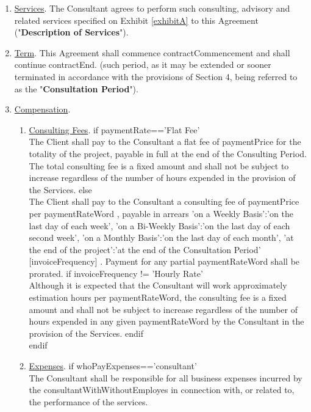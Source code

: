 \documentclass[12pt]{article}
\newcommand{\VAR}[1]{{\color{blue}#1}}
\newcommand{\BLOCK}[1]{{\smallskip \color{red}#1 \\ }}
\begin{document}
\begin{enumerate}
    \item \underline{Services}. The Consultant agrees to perform such consulting, advisory and related services specified on Exhibit \ref{exhibitA}
 to this Agreement ("{\bf Description of Services}").
    \item \underline{Term}. This Agreement shall commence \VAR{contractCommencement} and shall continue \VAR{contractEnd}. (such period, as it may be extended or sooner terminated in accordance with the provisions of Section 4, being referred to as the "{\bf Consultation Period}").
    \item \underline{Compensation}.
    \begin{enumerate}
        \item \underline{Consulting Fees}.
        \BLOCK{ if paymentRate=='Flat Fee' }
            The Client shall pay to the Consultant a flat fee of \VAR{ paymentPrice }
            for the totality of the project, payable in full at the end of the Consulting Period. The total consulting fee is a fixed amount and shall not be subject to increase regardless of the number of hours expended in the provision of the Services.
        \BLOCK{ else }
            The Client shall pay to the Consultant a consulting fee of \VAR{ paymentPrice } per \VAR{ paymentRateWord }, payable in arrears
            \VAR{
                {
                    'on a Weekly Basis':'on the last day of each week',
                    'on a Bi-Weekly Basis':'on the last day of each second week',
                    'on a Monthly Basis':'on the last day of each month',
                    'at the end of the project':'at the end of the Consultation Period'
                }[invoiceFrequency]
            }. Payment for any partial \VAR{ paymentRateWord }  shall be prorated.
            \BLOCK{ if invoiceFrequency != 'Hourly Rate' }
                Although it is expected that the Consultant will work approximately \VAR{estimation} hours per \VAR{paymentRateWord}, the consulting fee is a fixed amount and shall not be subject to increase regardless of the number of hours expended in any given \VAR{paymentRateWord} by the Consultant in the provision of the Services.
            \BLOCK{ endif }
        \BLOCK{ endif }
        \item \underline{Expenses}.
        \BLOCK{ if whoPayExpenses=='consultant'}
            The Consultant shall be responsible for all business expenses incurred by the \VAR{consultantWithWithoutEmployes} in connection with, or related to, the performance of the services.

\end{enumerate}
\end{enumerate}
\end{document}
